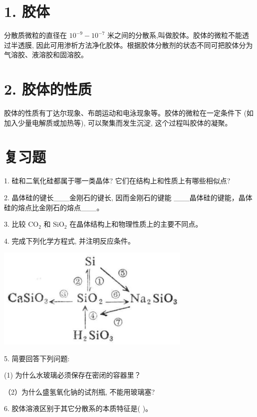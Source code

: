 \documentclass[10pt]{article}
\begin{document}
\section*{1. 胶体}

分散质微粒的直径在 \({10}^{-9} - {10}^{-7}\) 米之间的分散系,叫做胶体。胶体的微粒不能透过半透膜, 因此可用渗析方法净化胶体。根据胶体分散剂的状态不同可把胶体分为气溶胶、液溶胶和固溶胶。

\section*{2. 胶体的性质}

胶体的性质有丁达尔现象、布朗运动和电泳现象等。胶体的微粒在一定条件下 (如加入少量电解质或加热等), 可以聚集而发生沉淀, 这个过程叫胶体的凝聚。

\section*{复习题}

1. 硅和二氧化硅都属于哪一类晶体? 它们在结构上和性质上有哪些相似点?

2. 晶体硅的键长\_\_\_金刚石的键长, 因而金刚石的键能 \_\_\_晶体硅的键能，晶体硅的熔点比金刚石的熔点\_\_\_。

3. 比较 \({\mathrm{{CO}}}_{2}\) 和 \({\mathrm{{SiO}}}_{2}\) 在晶体结构上和物理性质上的主要不同点。

4. 完成下列化学方程式, 并注明反应条件。

\begin{center}
\includegraphics[max width=0.7\textwidth]{images/01912d13-9986-7822-a012-3f3f7be99dcb_125_912024.jpg}
\end{center}

5. 简要回答下列问题:

(1) 为什么水玻璃必须保存在密闭的容器里？

（2）为什么盛氢氧化钠的试剂瓶, 不能用玻璃塞?

6. 胶体溶液区别于其它分散系的本质特征是( )。
\end{document}
